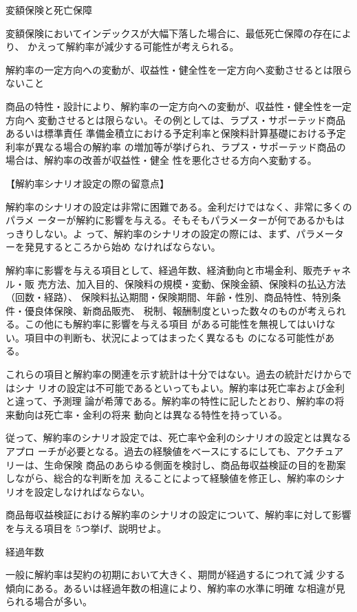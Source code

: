 \documentclass[report,gutter=10mm,fore-edge=10mm,uplatex,dvipdfmx]{jlreq}
\begin{document}
変額保険と死亡保障

変額保険においてインデックスが大幅下落した場合に、最低死亡保障の存在により、
かえって解約率が減少する可能性が考えられる。

解約率の一定方向への変動が、収益性・健全性を一定方向へ変動させるとは限らないこと

商品の特性・設計により、解約率の一定方向への変動が、収益性・健全性を一定方向へ
変動させるとは限らない。その例としては、ラプス・サポーテッド商品あるいは標準責任
準備金積立における予定利率と保険料計算基礎における予定利率が異なる場合の解約率
の増加等が挙げられ、ラプス・サポーテッド商品の場合は、解約率の改善が収益性・健全
性を悪化させる方向へ変動する。

【解約率シナリオ設定の際の留意点】

解約率のシナリオの設定は非常に困難である。金利だけではなく、非常に多くのパラメ
ーターが解約に影響を与える。そもそもパラメーターが何であるかもはっきりしない。よ
って、解約率のシナリオの設定の際には、まず、パラメーターを発見するところから始め
なければならない。

解約率に影響を与える項目として、経過年数、経済動向と市場金利、販売チャネル・販
売方法、加入目的、保険料の規模・変動、保険金額、保険料の払込方法（回数・経路）、
保険料払込期間・保険期間、年齢・性別、商品特性、特別条件・優良体保険、新商品販売、
税制、報酬制度といった数々のものが考えられる。この他にも解約率に影響を与える項目
がある可能性を無視してはいけない。項目中の判断も、状況によってはまったく異なるも
のになる可能性がある。

これらの項目と解約率の関連を示す統計は十分ではない。過去の統計だけからではシナ
リオの設定は不可能であるといってもよい。解約率は死亡率および金利と違って、予測理
論が希薄である。解約率の特性に記したとおり、解約率の将来動向は死亡率・金利の将来
動向とは異なる特性を持っている。

従って、解約率のシナリオ設定では、死亡率や金利のシナリオの設定とは異なるアプロ
ーチが必要となる。過去の経験値をべースにするにしても、アクチュアリーは、生命保険
商品のあらゆる側面を検討し、商品毎収益検証の目的を勘案しながら、総合的な判断を加
えることによって経験値を修正し、解約率のシナリオを設定しなければならない。


商品毎収益検証における解約率のシナリオの設定について、解約率に対して影響を与える項目を 5つ挙げ、説明せよ。

\answer{}

経過年数

一般に解約率は契約の初期において大きく、期問が経過するにつれて減
少する傾向にある。あるいは経過年数の相違により、解約率の水準に明確
な相違が見られる場合が多い。
\end{document}

